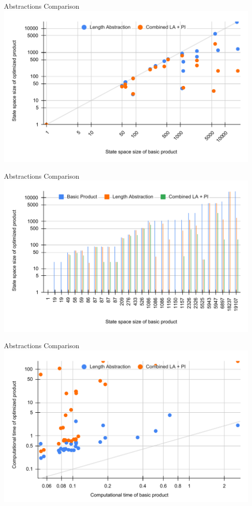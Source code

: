 \begin{frame}{Abstractions Comparison}
    \center\includegraphics[scale=0.5]{img/la_pi_scatter_combined.pdf}
\end{frame}

\begin{frame}{Abstractions Comparison}
    \center\includegraphics[scale=0.5]{img/la_pi_stacked_combined.pdf}
\end{frame}

\begin{frame}{Abstractions Comparison}
    \center\includegraphics[scale=0.5]{img/la_pi_scatter_time.pdf}
\end{frame}

